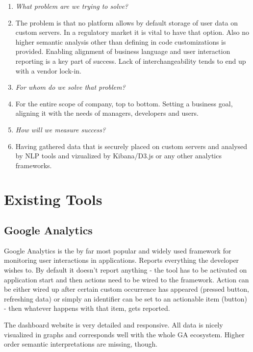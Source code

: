 \begin{enumerate}
	\item \emph{What problem are we trying to solve?}
	\item[] The problem is that no platform allows by default storage of user data on custom servers. In a regulatory market it is vital to have that option. Also no higher semantic analysis other than defining in code customizations is provided. Enabling alignment of business language and user interaction reporting is a key part of success. Lack of interchangeability tends to end up with a vendor lock-in.
	
	\item \emph{For whom do we solve that problem?}
	\item[] 	For the entire scope of company, top to bottom. Setting a business goal, aligning it with the needs of managers, developers and users.
	
	\item \emph{How will we measure success?}
	\item[] Having gathered data that is securely placed on custom servers and analysed by NLP tools and vizualized by Kibana/D3.js or any other analytics frameworks.
\end{enumerate}


\section{Existing Tools}

\subsection{Google Analytics}

Google Analytics is the by far most popular and widely used framework for monitoring user interactions in applications. Reports everything the developer wishes to. By default it doesn't report anything - the tool has to be activated on application start and then actions need to be wired to the framework. Action can be either wired up after certain custom occurrence has appeared (pressed button, refreshing data) or simply an identifier can be set to an actionable item (button) - then whatever happens with that item, gets reported.

The dashboard website is very detailed and responsive. All data is nicely visualized in graphs and corresponds well with the whole GA ecosystem. Higher order semantic interpretations are missing, though.


